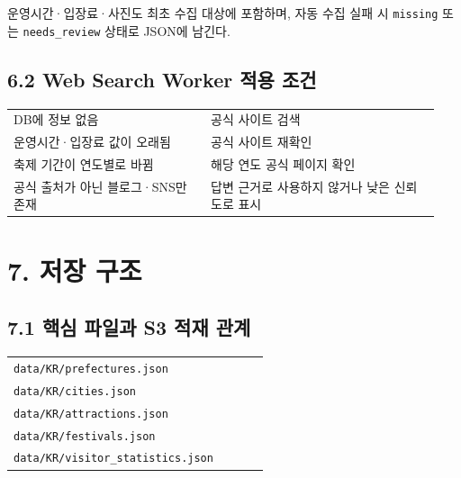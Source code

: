 \documentclass[12pt,a4paper]{article}
\newcommand{\DocNeedspace}[1]{\par\ifdim\dimexpr\pagegoal-\pagetotal\relax<#1\newpage\fi}
\begin{document}
\DocNeedspace{3\baselineskip}
운영시간·입장료·사진도 최초 수집 대상에 포함하며, 자동 수집 실패 시 \texttt{missing} 또는 \texttt{needs\_\allowbreak{}review} 상태로 JSON에 남긴다.


\DocNeedspace{24\baselineskip}
\subsection*{6.2 Web Search Worker 적용 조건}


\DocNeedspace{14\baselineskip}
\begin{small}
\begin{longtable}{@{}>{\RaggedRight\arraybackslash}m{0.432\linewidth}>{\RaggedRight\arraybackslash}m{0.508\linewidth}@{}}
\toprule
\multicolumn{1}{>{\centering\arraybackslash}m{0.432\linewidth}}{\textbf{조건}} & \multicolumn{1}{>{\centering\arraybackslash}m{0.508\linewidth}}{\textbf{처리}} \\
\midrule
\endhead
DB에 정보 없음 & 공식 사이트 검색 \\
운영시간·입장료 값이 오래됨 & 공식 사이트 재확인 \\
축제 기간이 연도별로 바뀜 & 해당 연도 공식 페이지 확인 \\
공식 출처가 아닌 블로그·SNS만 존재 & 답변 근거로 사용하지 않거나 낮은 신뢰도로 표시 \\
\bottomrule
\end{longtable}
\end{small}


\newpage

\DocNeedspace{10\baselineskip}
\section*{7. 저장 구조}


\DocNeedspace{8\baselineskip}
\subsection*{7.1 핵심 파일과 S3 적재 관계}


\DocNeedspace{16\baselineskip}
\begin{small}
\begin{longtable}{@{}>{\RaggedRight\arraybackslash}m{0.830\linewidth}@{}}
\toprule
\multicolumn{1}{>{\centering\arraybackslash}m{0.830\linewidth}}{\textbf{저장 경로}} \\
\midrule
\endhead
\texttt{data/\allowbreak{}KR/\allowbreak{}prefectures.\allowbreak{}json} \\
\texttt{data/\allowbreak{}KR/\allowbreak{}cities.\allowbreak{}json} \\
\texttt{data/\allowbreak{}KR/\allowbreak{}attractions.\allowbreak{}json} \\
\texttt{data/\allowbreak{}KR/\allowbreak{}festivals.\allowbreak{}json} \\
\texttt{data/\allowbreak{}KR/\allowbreak{}visitor\_\allowbreak{}statistics.\allowbreak{}json} \\
\bottomrule
\end{longtable}
\end{small}
\end{document}
